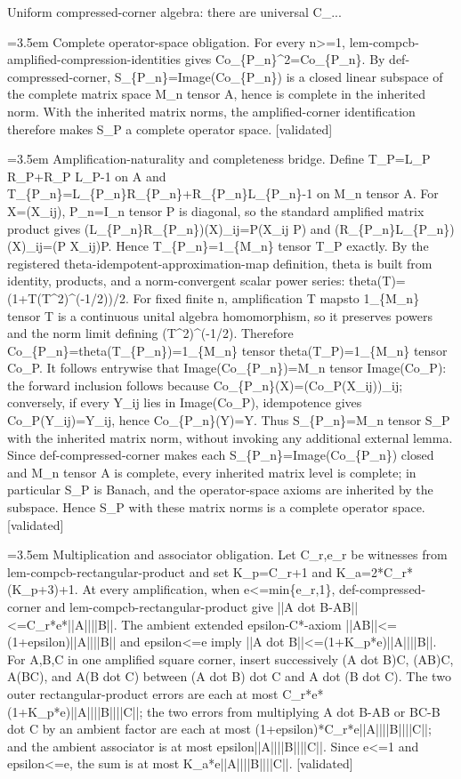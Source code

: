 \documentclass{article}
\newcommand{\step}[1]{\par\noindent\hangindent=3.5em\hangafter=1%
  \makebox[3.5em][l]{\textbf{#1.}}}
\newcommand{\steptag}[1]{\hfill{\small\textsf{[#1]}}}
\begin{document}
\begin{proofbox}{Uniform compressed-corner algebra: there are universal C\_...}
\step{1.2} Complete operator-space obligation. For every n>=1, lem-compcb-amplified-compression-identities gives Co\_\{P\_n\}\textasciicircum{}2=Co\_\{P\_n\}. By def-compressed-corner, S\_\{P\_n\}=Image(Co\_\{P\_n\}) is a closed linear subspace of the complete matrix space M\_n tensor A, hence is complete in the inherited norm. With the inherited matrix norms, the amplified-corner identification therefore makes S\_P a complete operator space. \steptag{validated} \\[6pt]
\step{1.2.1} Amplification-naturality and completeness bridge. Define T\_P=L\_P R\_P+R\_P L\_P-1 on A and T\_\{P\_n\}=L\_\{P\_n\}R\_\{P\_n\}+R\_\{P\_n\}L\_\{P\_n\}-1 on M\_n tensor A. For X=(X\_ij), P\_n=I\_n tensor P is diagonal, so the standard amplified matrix product gives (L\_\{P\_n\}R\_\{P\_n\})(X)\_ij=P(X\_ij P) and (R\_\{P\_n\}L\_\{P\_n\})(X)\_ij=(P X\_ij)P. Hence T\_\{P\_n\}=1\_\{M\_n\} tensor T\_P exactly. By the registered theta-idempotent-approximation-map definition, theta is built from identity, products, and a norm-convergent scalar power series: theta(T)=(1+T(T\textasciicircum{}2)\textasciicircum{}(-1/2))/2. For fixed finite n, amplification T mapsto 1\_\{M\_n\} tensor T is a continuous unital algebra homomorphism, so it preserves powers and the norm limit defining (T\textasciicircum{}2)\textasciicircum{}(-1/2). Therefore Co\_\{P\_n\}=theta(T\_\{P\_n\})=1\_\{M\_n\} tensor theta(T\_P)=1\_\{M\_n\} tensor Co\_P. It follows entrywise that Image(Co\_\{P\_n\})=M\_n tensor Image(Co\_P): the forward inclusion follows because Co\_\{P\_n\}(X)=(Co\_P(X\_ij))\_ij; conversely, if every Y\_ij lies in Image(Co\_P), idempotence gives Co\_P(Y\_ij)=Y\_ij, hence Co\_\{P\_n\}(Y)=Y. Thus S\_\{P\_n\}=M\_n tensor S\_P with the inherited matrix norm, without invoking any additional external lemma. Since def-compressed-corner makes each S\_\{P\_n\}=Image(Co\_\{P\_n\}) closed and M\_n tensor A is complete, every inherited matrix level is complete; in particular S\_P is Banach, and the operator-space axioms are inherited by the subspace. Hence S\_P with these matrix norms is a complete operator space. \steptag{validated} \\[4pt]
\step{1.3} Multiplication and associator obligation. Let C\_r,e\_r be witnesses from lem-compcb-rectangular-product and set K\_p=C\_r+1 and K\_a=2*C\_r*(K\_p+3)+1. At every amplification, when e<=min\{e\_r,1\}, def-compressed-corner and lem-compcb-rectangular-product give ||A dot B-AB||<=C\_r*e*||A||||B||. The ambient extended epsilon-C*-axiom ||AB||<=(1+epsilon)||A||||B|| and epsilon<=e imply ||A dot B||<=(1+K\_p*e)||A||||B||. For A,B,C in one amplified square corner, insert successively (A dot B)C, (AB)C, A(BC), and A(B dot C) between (A dot B) dot C and A dot (B dot C). The two outer rectangular-product errors are each at most C\_r*e*(1+K\_p*e)||A||||B||||C||; the two errors from multiplying A dot B-AB or BC-B dot C by an ambient factor are each at most (1+epsilon)*C\_r*e||A||||B||||C||; and the ambient associator is at most epsilon||A||||B||||C||. Since e<=1 and epsilon<=e, the sum is at most K\_a*e||A||||B||||C||. \steptag{validated} \\[6pt]

\end{proofbox}
\end{document}

